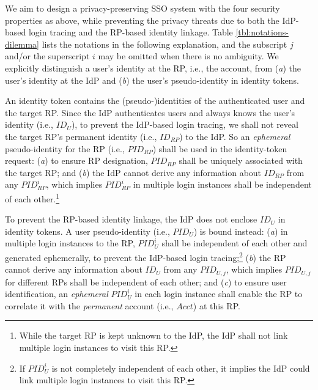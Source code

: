 We aim to design a privacy-preserving SSO system with the four security properties as above,
    while preventing the privacy threats due to both the IdP-based login tracing and the RP-based identity linkage.
Table \ref{tbl:notations-dilemma} lists the notations in the following explanation,
    and the subscript $j$ and/or the superscript $i$ may be omitted when there is no ambiguity.
We explicitly distinguish a user's identity at the RP, i.e., the account,
     from (\emph{a}) the user's identity at the IdP and (\emph{b}) the user's pseudo-identity in identity tokens.

An identity token contains the (pseudo-)identities of the authenticated user and the target RP. %
Since the IdP authenticates users and always knows the user's identity (i.e., $ID_U$),
    to prevent the IdP-based login tracing,
    we shall not reveal the target RP's permanent identity (i.e., $ID_{RP}$) to the IdP.
So an \emph{ephemeral} pseudo-identity for the RP (i.e., $PID_{RP}$) shall be used in the identity-token request:
(\emph{a}) to ensure RP designation,
     $PID_{RP}$ shall be uniquely associated with the target RP;
    and (\emph{b}) the IdP cannot derive any information about $ID_{RP}$ from any $PID_{RP}^i$,
        which implies $PID_{RP}^i$ in multiple login instances shall
         be independent of each other.\footnote{While the target RP is kept unknown to the IdP,
            the IdP shall not link multiple login instances to visit this RP.}

To prevent the RP-based identity linkage,
 the IdP does not enclose $ID_U$ in identity tokens.
A user pseudo-identity (i.e., $PID_U$) is bound instead:
    (\emph{a}) in multiple login instances to the RP, $PID_U^i$ shall be independent of each other and generated ephemerally,
        to prevent the IdP-based login tracing;\footnote{If $PID_U^i$ is not completely independent of each other,
         it implies the IdP could link multiple login instances to visit this RP.}
    (\emph{b}) the RP cannot derive any information about $ID_U$ from any $PID_{U,j}$,
    which implies $PID_{U,j}$ for different RPs shall be independent of each other;
    and (\emph{c}) to ensure user identification,
    an \emph{ephemeral} $PID_{U}^i$ in each login instance shall enable the RP to correlate it
     with the \emph{permanent} account  (i.e., $Acct$) at this RP.


